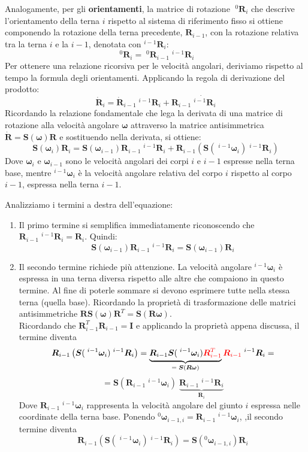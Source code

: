 ﻿\documentclass[11pt, a4paper]{article}
\begin{document}
Analogamente, per gli \textbf{orientamenti}, la matrice di rotazione \(\;^{0}\bm{R}_i\) che descrive l'orientamento della terna \(i\) rispetto al sistema di riferimento fisso si ottiene componendo la rotazione della terna precedente, \(\bm{R}_{i-1}\), con la rotazione relativa tra la terna \(i\) e la \(i-1\), denotata con \(^{i-1}{\bm{R}}_i\):
\[
    \;^{0}\bm{R}_i = \;^{0}\bm{R}_{i-1} \;^{i-1}{\bm{R}}_i
\]
Per ottenere una relazione ricorsiva per le velocità angolari, deriviamo rispetto al tempo la formula degli orientamenti. Applicando la regola di derivazione del prodotto:
\[
    \dot{\bm{R}}_i = \dot{\bm{R}}_{i-1} \;^{i-1}{\bm{R}}_i + \bm{R}_{i-1} \dot{\;^{i-1}{\bm{R}}}_i
\]
Ricordando la relazione fondamentale che lega la derivata di una matrice di rotazione alla velocità angolare \(\bm{\omega}\) attraverso la matrice antisimmetrica \(\dot{\bm{R}} = \bm{S}(\bm{\omega})\bm{R}\) e sostituendo nella derivata, si ottiene:
\[
    \bm{S}(\bm{\omega}_i)\bm{R}_i = \bm{S}(\bm{\omega}_{i-1})\bm{R}_{i-1}\;^{i-1}{\bm{R}}_i + \bm{R}_{i-1} \left( \bm{S}(\;^{i-1}{\bm{\omega}}_i) \;^{i-1}{\bm{R}}_i \right)
\]
Dove \(\bm{\omega}_i\) e \(\bm{\omega}_{i-1}\) sono le velocità angolari dei corpi \(i\) e \(i-1\) espresse nella terna base, mentre \(^{i-1}{\bm{\omega}}_i\) è la velocità angolare relativa del corpo \(i\) rispetto al corpo \(i-1\), espressa nella terna \(i-1\).

Analizziamo i termini a destra dell'equazione:
\begin{enumerate}
    \item Il primo termine si semplifica immediatamente riconoscendo che \(\bm{R}_{i-1}\;^{i-1}{\bm{R}}_i = \bm{R}_i\). Quindi:
    \[
        \bm{S}(\bm{\omega}_{i-1})\bm{R}_{i-1}\;^{i-1}{\bm{R}}_i = \bm{S}(\bm{\omega}_{i-1})\bm{R}_i
    \]
    \item Il secondo termine richiede più attenzione. La velocità angolare \(^{i-1}{\bm{\omega}}_i\) è espressa in una terna diversa rispetto alle altre che compaiono in questo termine. Al fine di poterle sommare si devono esprimere tutte nella stessa terna (quella base). Ricordando la proprietà di trasformazione delle matrici antisimmetriche \(\bm{R}\bm{S}(\bm{\omega})\bm{R}^T = \bm{S}(\bm{R}\bm{\omega})\).\\
    Ricordando che \(\bm{R}_{i-1}^T\bm{R}_{i-1} = \bm{I}\) e applicando la proprietà appena discussa, il termine diventa
    \[
        \bm{R}_{i-1} \left( \bm{S}(\;^{i-1}{\bm{\omega}}_i) \;^{i-1}{\bm{R}}_i \right) = \underbrace{\bm{R}_{i-1} \bm{S}(\;^{i-1}{\bm{\omega}}_i) \textcolor{red}{\bm{R}_{i-1}^T}}_{= \; \bm{S}(\bm{R}\bm{\omega})}\textcolor{red}{\bm{R}_{i-1}}\;^{i-1}{\bm{R}}_i =
    \]
    \[
        = \bm{S}(\bm{R}_{i-1}\;^{i-1}{\bm{\omega}}_{i}) \; \underbrace{\bm{R}_{i-1} \;^{i-1}{\bm{R}}_i}_{\bm{R}_i}
    \]
    Dove \(\bm{R}_{i-1}\;^{i-1}{\bm{\omega}}_{i}\) rappresenta la velocità angolare del giunto \(i\) espressa nelle coordinate della terna base.
    \newpage
    Ponendo \({}^{0}\bm{\omega}_{i-1,i} = \bm{R}_{i-1}\;^{i-1}{\bm{\omega}}_i\), ,il secondo termine diventa
    \[
        \bm{R}_{i-1} \left( \bm{S}(\;^{i-1}{\bm{\omega}}_i) \;^{i-1}{\bm{R}}_i \right) = \bm{S}({}^{0}\bm{\omega}_{i-1,i})\bm{R}_i
    \]
\end{enumerate}
\end{document}
